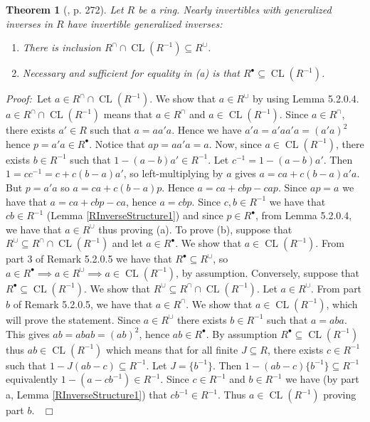 \documentclass[12pt, oneside]{book}
\newtheorem{theorem}{Theorem}[subsection]
\newcommand{\proof}{{\noindent \it Proof:~}}
\newcommand{\qed}{\hfill ~$\Box$\\}
\def\CL{\operatorname{CL}}
\begin{document}
\begin{theorem}[\cite{CH3}, p. 272] 
\normalfont
\noindent Let $R$ be a ring. Nearly invertibles with generalized inverses in $R$ have invertible
generalized inverses:
\begin{enumerate}[label=(\alph*)]
\item There is inclusion $R^{\cap} \cap \CL(R^{-1}) \subseteq R^{\cup}$.
\item Necessary and sufficient for equality in (a) is that $R^{\bullet} \subseteq \CL(R^{-1})$.
\end{enumerate}

\end{theorem}

\proof \space Let $a \in R^{\cap} \cap \CL(R^{-1})$. We show that $a \in R^{\cup}$ by using Lemma 5.2.0.4. $a \in R^{\cap} \cap \CL(R^{-1})$ means that $a \in R^{\cap}$ and $a \in \CL(R^{-1})$. Since $a \in R^{\cap}$, there exists $a' \in R$ such that $a=aa'a$. 
Hence we have $a'a=a'aa'a=(a'a)^2$ hence $p=a'a \in R^{\bullet}$. Notice that $ap=aa'a=a$. Now, since $a \in \CL(R^{-1})$, there exists $b \in R^{-1}$ such that $1-(a-b)a' \in R^{-1}$. Let $c^{-1}=1-(a-b)a'$. 
Then $1=cc^{-1}=c+c(b-a)a'$, so left-multiplying by $a$ gives $a=ca+c(b-a)a'a$. But $p=a'a$ so $a=ca+c(b-a)p$. 
Hence $a=ca+cbp-cap$. Since $ap=a$ we have that $a=ca+cbp-ca$, hence $a=cbp$. 
Since $c,b \in R^{-1}$ we have that $cb \in R^{-1}$ (Lemma \ref{RInverseStructure1}) and since $p \in R^{\bullet}$, from Lemma 5.2.0.4, we have that $a \in R^{\cup}$ thus proving (a).
\vskip 0.3cm
\noindent To prove (b), suppose that $R^{\cup} \subseteq R^{\cap} \cap \CL(R^{-1})$ and let $a \in R^{\bullet}$. We show that $a \in \CL(R^{-1})$. 
From part 3 of Remark 5.2.0.5 we have that $R^{\bullet} \subseteq R^{\cup}$, so $a \in R^{\bullet} \implies a \in R^{\cup} \implies a \in \CL(R^{-1})$, by assumption.
\vskip 0.3cm
\noindent Conversely, suppose that $R^{\bullet} \subseteq \CL(R^{-1})$. We show that $R^{\cup} \subseteq R^{\cap} \cap \CL(R^{-1})$. Let $a \in R^{\cup}$. From part $b$ of Remark 5.2.0.5, we have that 
$a \in R^{\cap}$. We show that $a \in \CL(R^{-1})$, which will prove the statement. Since $a \in R^{\cup}$
 there exists $b \in R^{-1}$ such that $a=aba$. This gives $ab=abab=(ab)^2$, hence $ab \in R^{\bullet}$. 
 By assumption $R^{\bullet} \subseteq \CL(R^{-1})$ thus $ab \in \CL(R^{-1})$ which means that for all
  finite $J \subseteq R$, there exists $c \in R^{-1}$ such that $1-J(ab-c) \subseteq R^{-1}$. 
 Let $J=\{ b^{-1} \}$. Then $1-(ab-c)\{b^{-1}\} \subseteq R^{-1}$ equivalently 
 $1-(a-cb^{-1}) \in R^{-1}$. 
Since $c \in R^{-1}$ and $b \in R^{-1}$ we have (by part a, Lemma \ref{RInverseStructure1}) that 
$cb^{-1} \in R^{-1}$. Thus $a \in \CL(R^{-1})$ proving part $b$. \qed
\end{document}

